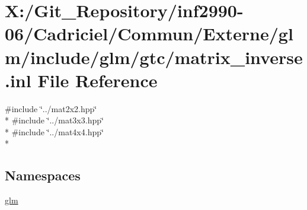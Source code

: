 \hypertarget{matrix__inverse_8inl}{\section{X\-:/\-Git\-\_\-\-Repository/inf2990-\/06/\-Cadriciel/\-Commun/\-Externe/glm/include/glm/gtc/matrix\-\_\-inverse.inl File Reference}
\label{matrix__inverse_8inl}
}
{\ttfamily \#include \char`\"{}../mat2x2.\-hpp\char`\"{}}\\*
{\ttfamily \#include \char`\"{}../mat3x3.\-hpp\char`\"{}}\\*
{\ttfamily \#include \char`\"{}../mat4x4.\-hpp\char`\"{}}\\*
\subsection*{Namespaces}
\begin{DoxyCompactItemize}
\item 
\hyperlink{namespaceglm}{glm}
\end{DoxyCompactItemize}
